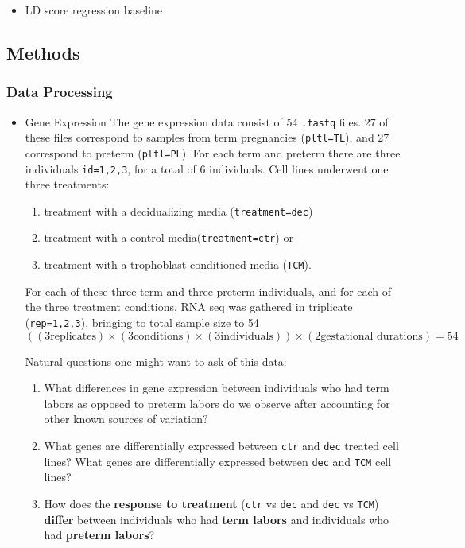 \begin{itemize}
\item LD score regression baseline\label{sec:org97696e5}
\end{itemize}

\subsection{Methods}\label{sec:org53944c4}


\subsubsection{Data Processing}\label{sec:orgc908098}

\begin{itemize}
\item Gene Expression\label{sec:orgbe0b3e5}
The gene expression data consist of 54 \texttt{.fastq} files.  27 of these files correspond to samples from term pregnancies (\texttt{pltl=TL}), and 27 correspond to preterm (\texttt{pltl=PL}).  For each term and preterm there are three 
individuals \texttt{id=1,2,3}, for a total of 6 individuals.  Cell lines underwent one three treatments:

\begin{enumerate}
\item treatment with a decidualizing media (\texttt{treatment=dec})
\item treatment with a control media(\texttt{treatment=ctr}) or
\item treatment with a trophoblast conditioned media (\texttt{TCM}).
\end{enumerate}

For each of these three term and three preterm individuals, and for each of the three treatment conditions, RNA seq was gathered in triplicate (\texttt{rep=1,2,3}), bringing to total sample size to 54 
$$ \left((3 \text{replicates}) \times (3 \text{conditions})  \times (3 \text{individuals})\right) \times (2 \text{gestational durations})=54$$

Natural questions one might want to ask of this data:

\begin{enumerate}
\item What differences in gene expression between individuals who had term labors as opposed to preterm labors do we observe after accounting for other known sources of variation?
\item What genes are differentially expressed between \texttt{ctr} and \texttt{dec} treated cell lines? What genes are differentially expressed between \texttt{dec} and \texttt{TCM} cell lines?
\item How does the \textbf{response to treatment} (\texttt{ctr} vs \texttt{dec} and \texttt{dec} vs \texttt{TCM}) \textbf{differ} between individuals who had \textbf{term labors} and individuals who had \textbf{preterm labors}?
\end{enumerate}


\end{itemize}
